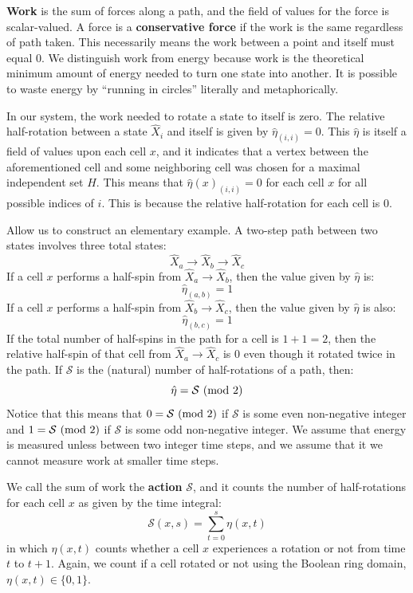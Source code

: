 \documentclass[10pt, a5paper, twoside, openright]{memoir}
\begin{document}
\textbf{Work} is the sum of forces along a path, and the field of values for the force is scalar-valued. A force is a \textbf{conservative force} if the work is the same regardless of path taken. This necessarily means the work between a point and itself must equal $0$. We distinguish work from energy because work is the theoretical minimum amount of energy needed to turn one state into another. It is possible to waste energy by ``running in circles'' literally and metaphorically.

In our system, the work needed to rotate a state to itself is zero. The relative half-rotation between a state $\hat X_i$ and itself is given by $\hat \eta_{(i,i)} = 0$. This $\hat \eta$ is itself a field of values upon each cell $x$, and it indicates that a vertex between the aforementioned cell and some neighboring cell was chosen for a maximal independent set $H$. This means that $\hat \eta(x)_{(i,i)} = 0$ for each cell $x$ for all possible indices of $i$. This is because the relative half-rotation for each cell is $0$. 

Allow us to construct an elementary example. A two-step path between two states involves three total states: 
$$\hat X_a \rightarrow \hat X_b \rightarrow \hat X_c$$
If a cell $x$ performs a half-spin from $\hat X_a \rightarrow \hat X_b$, then the value given by $\hat \eta$ is:
$$\hat \eta_{(a,b)} = 1$$
If a cell $x$ performs a half-spin from $\hat X_b \rightarrow \hat X_c$, then the value given by $\hat \eta$ is also:
$$\hat \eta_{(b,c)} = 1$$
If the total number of half-spins in the path for a cell is $1 + 1 = 2$, then the relative half-spin of that cell from $\hat X_a \rightarrow \hat X_c$ is $0$ even though it rotated twice in the path. If $\mathcal S$ is the (natural) number of half-rotations of a path, then:
$$\hat \eta = \mathcal S \ (\textnormal{mod} \ 2)$$
Notice that this means that $0 = \mathcal S \ (\textnormal{mod} \ 2)$ if $\mathcal S$ is some even non-negative integer and $1 = \mathcal S \ (\textnormal{mod} \ 2)$ if $\mathcal S$ is some odd non-negative integer. We assume that energy is measured unless between two integer time steps, and we assume that it we cannot measure work at smaller time steps.

We call the sum of work the \textbf{action} $\mathcal S$, and it counts the number of half-rotations for each cell $x$ as given by the time integral:
$$\mathcal S(x, s) = \sum\limits_{t=0}^s \eta(x, t)$$
in which $\eta(x, t)$ counts whether a cell $x$ experiences a rotation or not from time $t$ to $t+1$. Again, we count if a cell rotated or not using the Boolean ring domain, $\eta(x, t) \in \{0, 1\}$.
\end{document}
